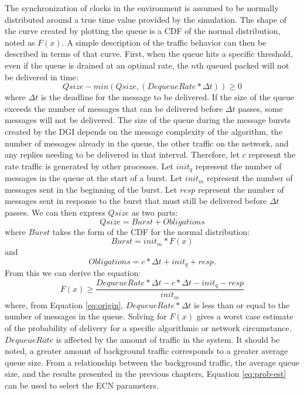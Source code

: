 The synchronization of clocks in the environment is assumed to be normally distributed around a true time value provided by the simulation.
The shape of the curve created by plotting the queue is a \ac{CDF} of the normal distribution, noted as $F(x)$.
A simple description of the traffic behavior can then be described in terms of that curve.
First, when the queue hits a specific threshold, even if the queue is drained at an optimal rate, the $n$th queued packed will not be delivered in time:
\begin{equation}
Qsize - min(Qsize, (DequeueRate * \Delta t)) \geq 0
\label{eq:origin}
\end{equation}%
where $\Delta t$ is the deadline for the message to be delivered.
If the size of the queue exceeds the number of messages that can be delivered before $\Delta t$ passes, some messages will not be delivered.
The size of the queue during the message bursts created by the DGI depends on the message complexity of the algorithm, the number of messages already in the queue, the other traffic on the network, and any replies needing to be delivered in that interval.
Therefore, let $c$ represent the rate traffic is generated by other processes.
Let $init_q$ represent the number of messages in the queue at the start of a burst. 
Let $init_m$ represent the number of messages sent in the beginning of the burst.
Let $resp$ represent the number of messages sent in response to the burst that must still be delivered before $\Delta t$ passes.
We can then express $Qsize$ as two parts:
\begin{equation}
Qsize = Burst + Obligations
\end{equation}%
where $Burst$ takes the form of the \ac{CDF} for the normal distribution:
\begin{equation}Burst = init_m * F(x)\end{equation}and
\begin{equation}
Obligations = c * \Delta t + init_q + resp.
\end{equation}
From this we can derive the equation:
\begin{equation}
F(x) \geq \frac{DequeueRate * \Delta t - c * \Delta t - init_q - resp}{init_m}
\label{eq:prob-est}
\end{equation}%
where, from Equation \ref{eq:origin}, $DequeueRate * \Delta t$ is less than or equal to the number of messages in the queue. 
Solving for $F(x)$ gives a worst case estimate of the probability of delivery for a specific algorithmic or network circumstance.
$DequeueRate$ is affected by the amount of traffic in the system. 
It should be noted, a greater amount of background traffic corresponds to a greater average queue size.
From a relationship between the background traffic, the average queue size, and the results presented in the previous chapters, Equation \ref{eq:prob-est} can be used to select the ECN parameters.

